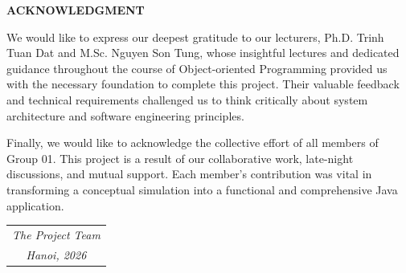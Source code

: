 \documentclass[../report_main.tex]{subfiles}
\begin{document}
\begin{center}
    \Large{\textbf{ACKNOWLEDGMENT}}\\
\end{center}
\vspace{1cm}

We would like to express our deepest gratitude to our lecturers, Ph.D. Trinh Tuan Dat and M.Sc. Nguyen Son Tung, whose insightful lectures and dedicated guidance throughout the course of Object-oriented Programming provided us with the necessary foundation to complete this project. Their valuable feedback and technical requirements challenged us to think critically about system architecture and software engineering principles.

Finally, we would like to acknowledge the collective effort of all members of Group 01. This project is a result of our collaborative work, late-night discussions, and mutual support. Each member's contribution was vital in transforming a conceptual simulation into a functional and comprehensive Java application.

\vspace{1cm}
\begin{flushright}
\begin{tabular}{@{}c@{}}
    \textit{The Project Team} \\
    \textit{Hanoi, 2026}
\end{tabular}
\end{flushright}
\end{document}
